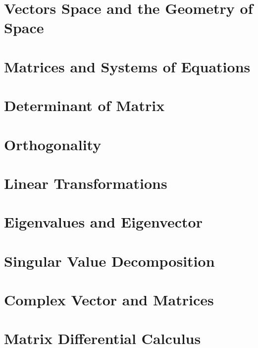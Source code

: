 \chapterspaceabove{6.75cm} 
\chapterspacebelow{7.25cm} 
\chapter{Vectors Space and the Geometry of Space}






\chapterspaceabove{6.75cm} 
\chapterspacebelow{7.25cm} 
\chapter{Matrices and Systems of Equations}


\chapterspaceabove{6.75cm} 
\chapterspacebelow{7.25cm} 
\chapter{Determinant of Matrix}


\chapterspaceabove{6.75cm} 
\chapterspacebelow{7.25cm} 
\chapter{Orthogonality}


\chapterspaceabove{6.75cm} 
\chapterspacebelow{7.25cm} 
\chapter{Linear Transformations}

\chapterspaceabove{6.75cm} 
\chapterspacebelow{7.25cm} 
\chapter{Eigenvalues and Eigenvector}


\chapterspaceabove{6.75cm} 
\chapterspacebelow{7.25cm} 
\chapter{Singular Value Decomposition}


\chapterspaceabove{6.75cm} 
\chapterspacebelow{7.25cm} 
\chapter{Complex Vector and Matrices}



\chapterspaceabove{6.75cm} 
\chapterspacebelow{7.25cm} 
\chapter{Matrix Differential Calculus}